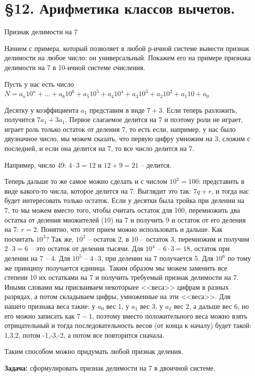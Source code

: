 \documentclass[russian]{lecture-notes}
\begin{document}
	\section*{\S 12. Арифметика классов вычетов.}
	
	\begin{example*} {Признак делимости на 7}
		
		Начнем с примера, который позволяет в любой р-ичной системе вывести признак делимости на любое число: он универсальный. Покажем его на примере признака делимости на 7 в 10-ичной системе счисления.
		
		Пусть у нас есть число $N = a_n 10^n + ... + a_6 10^6 + a_5 10^5 + a_4 10^4 + a_3 10^3 + a_2 10^2 + a_1 10 + a_0$ 
		
		Десятку у коэффициента $a_1$ представим в виде $7+3$. Если теперь разложить, получится $7a_1 + 3a_1$. Первое слагаемое делится на 7 и поэтому роли не играет, играет роль только остаток от деления 7, то есть если, например, у нас было двузначное число, мы можем сказать, что первую цифру умножим на 3, сложим с последней, и если она делится на 7, то все число делится на 7. 
		
		Например, число 49: $4 \cdot 3 = 12$ и $12 + 9 = 21$ -- делится.
		
		Теперь дальше то же самое можно сделать и с числом $10^2 = 100$: представить в виде какого-то числа, которое делится на 7. Выглядит это так: $7q + r$, и тогда нас будет интересовать только остаток. Если у десятки была тройка при делении на 7, то мы можем вместо того, чтобы считать остаток для 100, перемножить два остатка от деления множителей (10) на 7  и получить 9 и остаток от его деления на 7: $r = 2$. Понятно, что этот прием можно использовать и дальше. Как посчитать $10^3$? Так же, $10^2$ -- остаток 2, в 10 -- остаток 3, перемножим и получим $2 \cdot 3 = 6$ -- это остаток от деления тысячи. Для $10^4$ -- $6 \cdot 3 = 18$, остаток при делении на 7 -- 4. Для $10^5$ -- $4 \cdot 3$, при делении на 7 получается 5. Для $10^6$ по тому же принципу получается единица. Таким образом мы можем заменить все степени 10 их остатками на 7 и получить требуемый признак делимости на 7. Иными словами мы присваиваем некоторыее <<веса>>  цифрам в разных разрядах, а потом складываем цифры, умноженные на эти <<веса>>. Для нашего признака веса такие: у $a_0$ вес 1, у $a_1$ вес 3, у $a_2$ вес 2, а дальше вес 6, но его можно записать как $7-1$, поэтому вместо положительного веса можно взять отрицательный и тогда последовательность весов (от конца к началу) будет такой: 1,3,2, потом -1,-3,-2, а потом все повторится сначала.
		
		Таким способом можно придумать любой признак деления.
	\end{example*}

	\textbf{Задача:} сформулировать признак делимости на 7 в двоичной системе.
	
\end{document}
